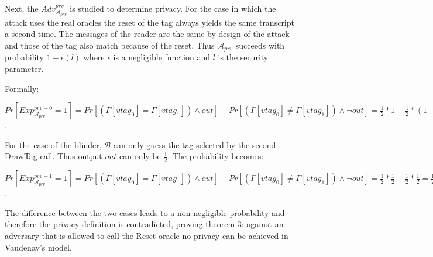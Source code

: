     Next, the $Adv_{\mathcal{A}_{prv}}^{prv}$ is studied to determine privacy. For the case in which the attack uses the real oracles the reset of the tag always yields the same transcript a second time. 
    The messages of the reader are the same by design of the attack and those of the tag also match because of the reset. Thus $\mathcal{A}_{prv}$ succeeds with probability $1-\epsilon(l)$
    where $\epsilon$ is a negligible function and $l$ is the security parameter.

    Formally:

    $Pr[Exp_{\mathcal{A}_{prv}}^{prv-0} = 1] = Pr[(\Gamma[vtag_{0}] = \Gamma[vtag_{1}]) \land out] + Pr[(\Gamma[vtag_{0}] \neq \Gamma[vtag_{1}]) \land \lnot out] = 
        \frac{1}{2}*1+\frac{1}{2}*(1-\epsilon(l)) = 1-\epsilon(l)/2$.
    
    For the case of the blinder, $\mathcal{B}$ can only guess the tag selected by the second DrawTag call. Thus output $out$ can only be $\frac{1}{2}.$ The probability becomes:

    $Pr[Exp_{\mathcal{A}_{prv}}^{prv-1} = 1] = Pr[(\Gamma[vtag_{0}] = \Gamma[vtag_{1}]) \land out] + Pr[(\Gamma[vtag_{0}] \neq \Gamma[vtag_{1}]) \land \lnot out] = 
        \frac{1}{2}*\frac{1}{2}+\frac{1}{2}*\frac{1}{2} = \frac{1}{2}$.

    The difference between the two cases leads to a non-negligible probability and therefore the privacy definition is contradicted, proving theorem 3: against an adversary that is allowed to call the 
    Reset oracle no privacy can be achieved in Vaudenay's model.

